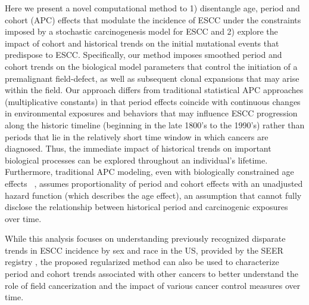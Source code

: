 \documentclass[10pt,letterpaper]{article}
\begin{document}
Here we present a novel computational method to 1) disentangle age, period and cohort (APC) effects that modulate the incidence of ESCC under the constraints imposed by a stochastic carcinogenesis model for ESCC and 2) explore the impact of cohort and historical trends on the initial mutational events that predispose to ESCC. Specifically, our method imposes smoothed period and cohort trends on the biological model parameters that control the initiation of a premalignant field-defect, as well as subsequent clonal expansions that may arise within the field. Our approach differs from traditional statistical APC approaches (multiplicative constants) in that period effects coincide with continuous changes in environmental exposures and behaviors that may influence ESCC progression along the historic timeline (beginning in the late 1800's to the 1990's) rather than periods that lie in the relatively short time window in which cancers are diagnosed. Thus, the immediate impact of historical trends on important biological processes can be explored throughout an individual's lifetime. Furthermore, traditional APC modeling, even with biologically constrained age effects ~\cite{Holford1991, Luebeck2002, Jeon2006, Meza2008}, assumes proportionality of period and cohort effects with an unadjusted hazard function (which describes the age effect), an assumption that cannot fully disclose the relationship between historical period and carcinogenic exposures over time. 

While this analysis focuses on understanding previously recognized disparate trends in ESCC incidence by sex and race in the US, provided by the SEER registry \cite{SEER2019}, the proposed regularized method can also be used to characterize period and cohort trends associated with other cancers to better understand the role of field cancerization and the impact of various cancer control measures over time. 
\end{document}
